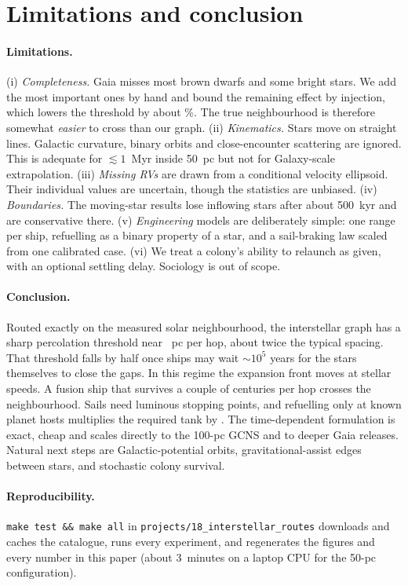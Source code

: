 \section{Limitations and conclusion}
\label{sec:conclusion}

\paragraph{Limitations.} (i) \emph{Completeness.} Gaia misses most brown dwarfs
and some bright stars. We add the most important ones by hand and bound the
remaining effect by injection, which lowers the threshold by about
\PctBDTwenty\%. The true neighbourhood is therefore somewhat \emph{easier} to
cross than our graph. (ii) \emph{Kinematics.} Stars move on straight lines.
Galactic curvature, binary orbits and close-encounter scattering are ignored.
This is adequate for $\lesssim1$~Myr inside 50~pc but not for Galaxy-scale
extrapolation. (iii) \emph{Missing RVs} are drawn from a conditional velocity
ellipsoid. Their individual values are uncertain, though the statistics are
unbiased. (iv) \emph{Boundaries.} The moving-star results lose inflowing stars
after about 500~kyr and are conservative there. (v) \emph{Engineering} models
are deliberately simple: one range per ship, refuelling as a binary property of
a star, and a sail-braking law scaled from one calibrated case. (vi) We treat
a colony's ability to relaunch as given, with an optional settling delay.
Sociology is out of scope.

\paragraph{Conclusion.} Routed exactly on the measured solar neighbourhood, the
interstellar graph has a sharp percolation threshold near \RFifty~pc per hop,
about twice the typical spacing. That threshold falls by half once ships may
wait $\sim$$10^5$ years for the stars themselves to close the gaps. In this
regime the expansion front moves at stellar speeds. A fusion ship that survives
a couple of centuries per hop crosses the neighbourhood. Sails need luminous
stopping points, and refuelling only at known planet hosts multiplies the
required tank by \TankRatio. The time-dependent formulation is exact, cheap and
scales directly to the 100-pc GCNS and to deeper Gaia releases. Natural next
steps are Galactic-potential orbits, gravitational-assist edges between stars,
and stochastic colony survival.

\paragraph{Reproducibility.} \texttt{make test \&\& make all} in
\texttt{projects/18\_interstellar\_routes} downloads and caches the catalogue,
runs every experiment, and regenerates the figures and every number in this
paper (about 3~minutes on a laptop CPU for the 50-pc configuration).
